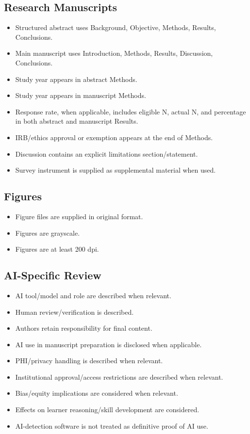 \documentclass[12pt]{article}
\begin{document}
\subsection*{Research Manuscripts}

\begin{itemize}[label=$\square$, leftmargin=*]
	\item Structured abstract uses Background, Objective, Methods, Results,
	      Conclusions.
	\item Main manuscript uses Introduction, Methods, Results, Discussion,
	      Conclusions.
	\item Study year appears in abstract Methods.
	\item Study year appears in manuscript Methods.
	\item Response rate, when applicable, includes eligible N, actual N, and
	      percentage in both abstract and manuscript Results.
	\item IRB/ethics approval or exemption appears at the end of Methods.
	\item Discussion contains an explicit limitations section/statement.
	\item Survey instrument is supplied as supplemental material when used.
\end{itemize}

\subsection*{Figures}

\begin{itemize}[label=$\square$, leftmargin=*]
	\item Figure files are supplied in original format.
	\item Figures are grayscale.
	\item Figures are at least 200 dpi.
\end{itemize}

\subsection*{AI-Specific Review}

\begin{itemize}[label=$\square$, leftmargin=*]
	\item AI tool/model and role are described when relevant.
	\item Human review/verification is described.
	\item Authors retain responsibility for final content.
	\item AI use in manuscript preparation is disclosed when applicable.
	\item PHI/privacy handling is described when relevant.
	\item Institutional approval/access restrictions are described when relevant.
	\item Bias/equity implications are considered when relevant.
	\item Effects on learner reasoning/skill development are considered.
	\item AI-detection software is not treated as definitive proof of AI use.
\end{itemize}
\end{document}
